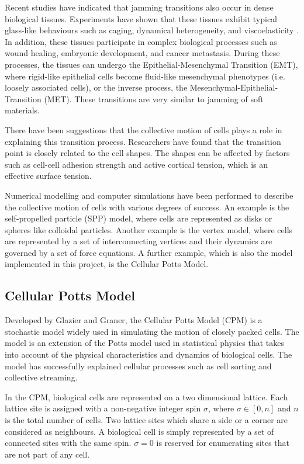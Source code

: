 \documentclass[a4paper,12pt]{article}
\begin{document}
Recent studies have indicated that jamming transitions also occur in dense biological tissues. Experiments have shown that these tissues exhibit typical glass-like behaviours such as caging, dynamical heterogeneity, and viscoelasticity \cite{schoetz2013,angelini2011}. In addition, these tissues participate in complex biological processes such as wound healing, embryonic development, and cancer metastasis. During these processes, the tissues can undergo the Epithelial-Mesenchymal Transition (EMT), where rigid-like epithelial cells become fluid-like mesenchymal phenotypes (i.e. loosely associated cells), or the inverse process, the Mesenchymal-Epithelial-Transition (MET). These transitions are very similar to jamming of soft materials. 

There have been suggestions that the collective motion of cells plays a role in explaining this transition process. Researchers have found that the transition point is closely related to the cell shapes\cite{bi-density2015}. The shapes can be affected by factors such as cell-cell adhesion strength and active cortical tension, which is an effective surface tension.

Numerical modelling and computer simulations have been performed to describe the collective motion of cells with various degrees of success. An example is the self-propelled particle (SPP) model, where cells are represented as disks or spheres like colloidal particles. Another example is the vertex model, where cells are represented by a set of interconnecting vertices and their dynamics are governed by a set of force equations. A further example, which is also the model implemented in this project, is the Cellular Potts Model.  


\subsection{Cellular Potts Model}
Developed by Glazier and Graner\cite{graner1992}, the Cellular Potts Model (CPM) is a stochastic model widely used in simulating the motion of closely packed cells. The model is an extension of the Potts model used in statistical physics that takes into account of the physical characteristics and dynamics of biological cells. The model has successfully explained cellular processes such as cell sorting \cite{graner1992} and collective streaming\cite{szabo2010}.

In the CPM, biological cells are represented on a two dimensional lattice. Each lattice site is assigned with a non-negative integer spin $\sigma$, where $\sigma \in [0,n]$ and $n$ is the total number of cells. Two lattice sites which share a side or a corner are considered as neighbours. A biological cell is simply represented by a set of connected sites with the same spin. $\sigma = 0$ is reserved for enumerating sites that are not part of any cell.
\end{document}
